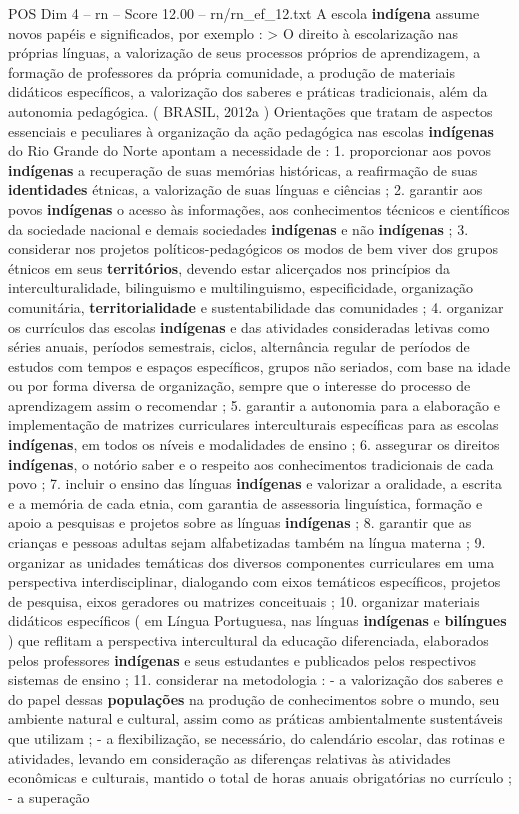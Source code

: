 \begin{textsample}{POS Dim 4 – rn – Score 12.00 – rn/rn\_ef\_12.txt}
A escola \textbf{indígena} assume novos papéis e significados, por exemplo : > O direito à escolarização nas próprias línguas, a valorização de seus processos próprios de aprendizagem, a formação de professores da própria comunidade, a produção de materiais didáticos específicos, a valorização dos saberes e práticas tradicionais, além da autonomia pedagógica. ( BRASIL, 2012a ) Orientações que tratam de aspectos essenciais e peculiares à organização da ação pedagógica nas escolas \textbf{indígenas} do Rio Grande do Norte apontam a necessidade de : 1. proporcionar aos povos \textbf{indígenas} a recuperação de suas memórias históricas, a reafirmação de suas \textbf{identidades} étnicas, a valorização de suas línguas e ciências ; 2. garantir aos povos \textbf{indígenas} o acesso às informações, aos conhecimentos técnicos e científicos da sociedade nacional e demais sociedades \textbf{indígenas} e não \textbf{indígenas} ; 3. considerar nos projetos políticos-pedagógicos os modos de bem viver dos grupos étnicos em seus \textbf{territórios}, devendo estar alicerçados nos princípios da interculturalidade, bilinguismo e multilinguismo, especificidade, organização comunitária, \textbf{territorialidade} e sustentabilidade das comunidades ; 4. organizar os currículos das escolas \textbf{indígenas} e das atividades consideradas letivas como séries anuais, períodos semestrais, ciclos, alternância regular de períodos de estudos com tempos e espaços específicos, grupos não seriados, com base na idade ou por forma diversa de organização, sempre que o interesse do processo de aprendizagem assim o recomendar ; 5. garantir a autonomia para a elaboração e implementação de matrizes curriculares interculturais específicas para as escolas \textbf{indígenas}, em todos os níveis e modalidades de ensino ; 6. assegurar os direitos \textbf{indígenas}, o notório saber e o respeito aos conhecimentos tradicionais de cada povo ; 7. incluir o ensino das línguas \textbf{indígenas} e valorizar a oralidade, a escrita e a memória de cada etnia, com garantia de assessoria linguística, formação e apoio a pesquisas e projetos sobre as línguas \textbf{indígenas} ; 8. garantir que as crianças e pessoas adultas sejam alfabetizadas também na língua materna ; 9. organizar as unidades temáticas dos diversos componentes curriculares em uma perspectiva interdisciplinar, dialogando com eixos temáticos específicos, projetos de pesquisa, eixos geradores ou matrizes conceituais ; 10. organizar materiais didáticos específicos ( em Língua Portuguesa, nas línguas \textbf{indígenas} e \textbf{bilíngues} ) que reflitam a perspectiva intercultural da educação diferenciada, elaborados pelos professores \textbf{indígenas} e seus estudantes e publicados pelos respectivos sistemas de ensino ; 11. considerar na metodologia : - a valorização dos saberes e do papel dessas \textbf{populações} na produção de conhecimentos sobre o mundo, seu ambiente natural e cultural, assim como as práticas ambientalmente sustentáveis que utilizam ; - a flexibilização, se necessário, do calendário escolar, das rotinas e atividades, levando em consideração as diferenças relativas às atividades econômicas e culturais, mantido o total de horas anuais obrigatórias no currículo ; - a superação 
\end{textsample}

